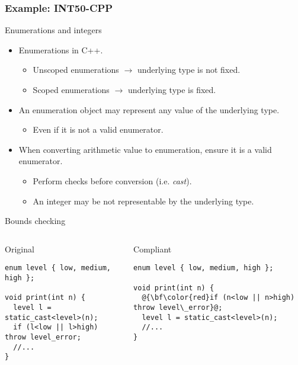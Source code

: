 \subsubsection{Example: INT50-CPP}

\begin{frame}[t]{Enumerations and integers}
\begin{itemize}
  \item Enumerations in C++.
    \begin{itemize}
      \item Unscoped enumerations $\rightarrow$ underlying type is not fixed.
      \item Scoped enumerations $\rightarrow$ underlying type is fixed.
    \end{itemize}

  \vfill
  \item An enumeration object may represent any value of the underlying type.
    \begin{itemize}
      \item Even if it is not a valid enumerator.
    \end{itemize}

  \vfill
  \item When converting arithmetic value to enumeration, ensure it is a valid enumerator.
    \begin{itemize}
      \item Perform checks before conversion (i.e. \emph{cast}).
      \item An integer may be not representable by the underlying type.
    \end{itemize}
\end{itemize}
\end{frame}

\begin{frame}[t,fragile]{Bounds checking}
\begin{columns}

\begin{block}{Original}
\begin{lstlisting}
enum level { low, medium, high };

void print(int n) {
  level l = static_cast<level>(n);
  if (l<low || l>high) throw level_error;
  //...
}
\end{lstlisting}
\end{block}

\pause
{}
\begin{block}{Compliant}
\begin{lstlisting}[escapechar=@]
enum level { low, medium, high };

void print(int n) {
  @{\bf\color{red}if (n<low || n>high) throw level\_error}@;
  level l = static_cast<level>(n);
  //...
}
\end{lstlisting}
\end{block}

\end{columns}
\end{frame}

